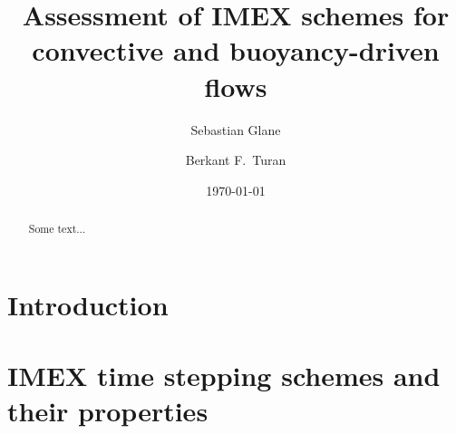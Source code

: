 \documentclass[review]{revtex4-1}
\begin{document}

\title{Assessment of IMEX schemes for convective and buoyancy-driven flows}

\author{Sebastian Glane}
\author{Berkant F.\ Turan}


\date{\today}

\begin{abstract}
Some text...
\end{abstract}

\maketitle %

\section{Introduction\label{sec:Introduction}}
\section{IMEX time stepping schemes and their properties\label{sec:IMEXSchemes}}
\end{document}
